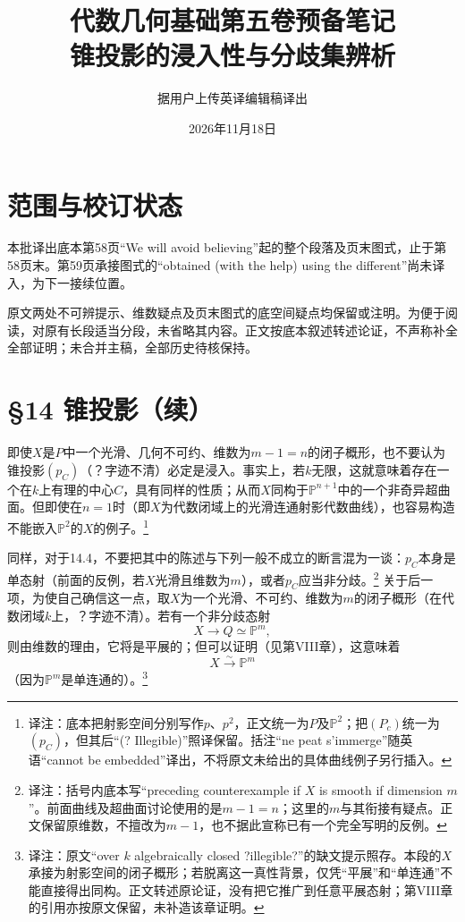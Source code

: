 \documentclass[openany,fontset=fandol]{ctexbook}
\newcommand{\note}[1]{\unskip\nobreak\footnote{译注：#1}}
\begin{document}
\title{代数几何基础第五卷预备笔记\\锥投影的浸入性与分歧集辨析}
\author{据用户上传英译编辑稿译出}
\date{2026年11月18日}
\maketitle
\chapter*{范围与校订状态}
本批译出底本第58页“We will avoid believing”起的整个段落及页末图式，止于第58页末。第59页承接图式的“obtained (with the help) using the different”尚未译入，为下一接续位置。

原文两处不可辨提示、维数疑点及页末图式的底空间疑点均保留或注明。为便于阅读，对原有长段适当分段，未省略其内容。正文按底本叙述转述论证，不声称补全全部证明；未合并主稿，全部历史待核保持。
\chapter*{§14 锥投影（续）}
即使$X$是$P$中一个光滑、几何不可约、维数为$m-1=n$的闭子概形，也不要认为锥投影$(p_C)$（？字迹不清）必定是浸入。事实上，若$k$无限，这就意味着存在一个在$k$上有理的中心$C$，具有同样的性质；从而$X$同构于$\mathbb P^{n+1}$中的一个非奇异超曲面。但即使在$n=1$时（即$X$为代数闭域上的光滑连通射影代数曲线），也容易构造不能嵌入$\mathbb P^2$的$X$的例子。\note{底本把射影空间分别写作$p$、$p^2$，正文统一为$P$及$\mathbb P^2$；把$(P_c)$统一为$(p_C)$，但其后“(? Illegible)”照译保留。括注“ne peat s’immerge”随英语“cannot be embedded”译出，不将原文未给出的具体曲线例子另行插入。}

同样，对于14.4，不要把其中的陈述与下列一般不成立的断言混为一谈：$p_C$本身是单态射（前面的反例，若$X$光滑且维数为$m$），或者$p_C$应当非分歧。\note{括号内底本写“preceding counterexample if $X$ is smooth if dimension $m$”。前面曲线及超曲面讨论使用的是$m-1=n$；这里的$m$与其衔接有疑点。正文保留原维数，不擅改为$m-1$，也不据此宣称已有一个完全写明的反例。}
关于后一项，为使自己确信这一点，取$X$为一个光滑、不可约、维数为$m$的闭子概形（在代数闭域$k$上，？字迹不清）。若有一个非分歧态射
\[
X\longrightarrow Q\simeq\mathbb P^m,
\]
则由维数的理由，它将是平展的；但可以证明（见第VIII章），这意味着
\[
X\xrightarrow{\sim}\mathbb P^m
\]
（因为$\mathbb P^m$是单连通的）。\note{原文“over $k$ algebraically closed ?illegible?”的缺文提示照存。本段的$X$承接为射影空间的闭子概形；若脱离这一真性背景，仅凭“平展”和“单连通”不能直接得出同构。正文转述原论证，没有把它推广到任意平展态射；第VIII章的引用亦按原文保留，未补造该章证明。}
\end{document}
